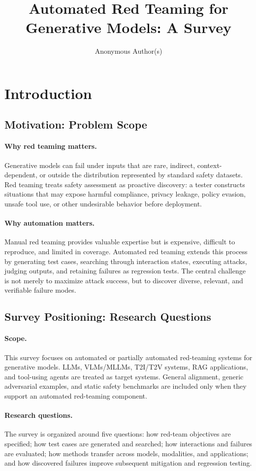 \documentclass[review]{fcs}
\title{Automated Red Teaming for Generative Models: A Survey}
\author[1,*]{Anonymous Author(s)}
\begin{document}
\section{Introduction}

\subsection{Motivation: Problem Scope}

\paragraph{Why red teaming matters.}
Generative models can fail under inputs that are rare, indirect, context-dependent, or outside the distribution represented by standard safety datasets. Red teaming treats safety assessment as proactive discovery: a tester constructs situations that may expose harmful compliance, privacy leakage, policy evasion, unsafe tool use, or other undesirable behavior before deployment.

\paragraph{Why automation matters.}
Manual red teaming provides valuable expertise but is expensive, difficult to reproduce, and limited in coverage. Automated red teaming extends this process by generating test cases, searching through interaction states, executing attacks, judging outputs, and retaining failures as regression tests. The central challenge is not merely to maximize attack success, but to discover diverse, relevant, and verifiable failure modes.

\subsection{Survey Positioning: Research Questions}

\paragraph{Scope.}
This survey focuses on automated or partially automated red-teaming systems for generative models. LLMs, VLMs/MLLMs, T2I/T2V systems, RAG applications, and tool-using agents are treated as target systems. General alignment, generic adversarial examples, and static safety benchmarks are included only when they support an automated red-teaming component.

\paragraph{Research questions.}
The survey is organized around five questions: how red-team objectives are specified; how test cases are generated and searched; how interactions and failures are evaluated; how methods transfer across models, modalities, and applications; and how discovered failures improve subsequent mitigation and regression testing.
\end{document}

